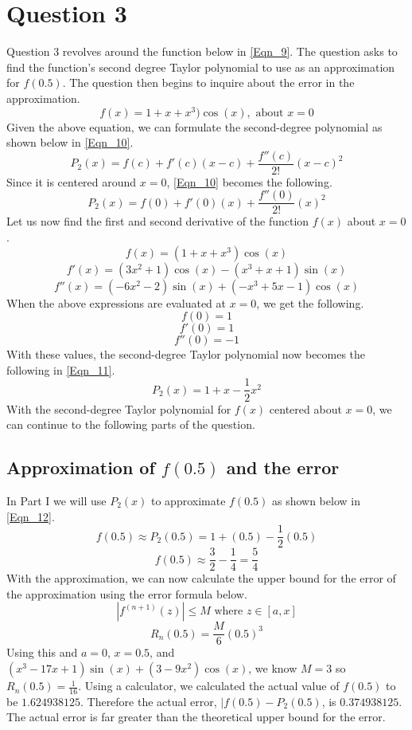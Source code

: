 \documentclass{article}
\begin{document}
\section{Question 3}
Question 3 revolves around the function below in \ref{Eqn_9}. The question asks to find the function's second degree Taylor polynomial to use as an approximation for \(f(0.5)\). The question then begins to inquire about the error in the approximation.
\begin{equation}
    \label{Eqn_9}
    f(x) = 1 + x + x^3)\cos{(x)}, \mbox{ about } x = 0
\end{equation}
Given the above equation, we can formulate the second-degree polynomial as shown below in \ref{Eqn_10}.
\begin{equation}
    \label{Eqn_10}
    P_2(x) = f(c) + f'(c)(x-c) + \frac{f''(c)}{2!}(x-c)^2
\end{equation}
Since it is centered around \(x=0\), \ref{Eqn_10} becomes the following.
\[
P_2(x) = f(0) + f'(0)(x) + \frac{f''(0)}{2!}(x)^2
\]
Let us now find the first and second derivative of the function \(f(x)\) about \(x=0\).
\[
f(x) = (1 + x + x^3)\cos{(x)}
\]
\[
f'(x) = \left(3x^{2} + 1\right) \cos\left(x\right) - \left(x^{3} + x + 1\right) \sin\left(x\right)
\]
\[
f''(x) = \left(-6x^{2} - 2\right) \sin\left(x\right) + \left(-x^{3} + 5x - 1\right) \cos\left(x\right)
\]
When the above expressions are evaluated at \(x=0\), we get the following.
\[
f(0) = 1
\]
\[
f'(0) = 1
\]
\[
f''(0) = -1
\]
With these values, the second-degree Taylor polynomial now becomes the following in \ref{Eqn_11}.
\begin{equation}
    \label{Eqn_11}
    P_2(x) = 1 + x - \frac{1}{2}x^2
\end{equation}
With the second-degree Taylor polynomial for \(f(x)\) centered about \(x=0\), we can continue to the following parts of the question.

\subsection{Approximation of \(f(0.5)\) and the error}
In Part I we will use \(P_2(x)\) to approximate \(f(0.5)\) as shown below in \ref{Eqn_12}.
\begin{equation}
    \label{Eqn_12}
    f(0.5) \approx P_2(0.5) = 1 + (0.5) - \frac{1}{2}(0.5)
\end{equation}
\[
f(0.5) \approx \frac{3}{2} - \frac{1}{4} = \frac{5}{4}
\]
With the approximation, we can now calculate the upper bound for the error of the approximation using the error formula below.
\[
|f^{(n+1)}(z)| \leq M \mbox{ where } z \in [a,x]
\]
\[
R_n(0.5) = \frac{M}{6}(0.5)^3
\]
Using this and \(a = 0\), \(x = 0.5\), and \(\left(x^{3} - 17x + 1\right) \sin\left(x\right) + \left(3 - 9x^{2}\right) \cos\left(x\right)\), we know \(M =  3\) so \(R_n(0.5) = \frac{1}{16}\). Using a calculator, we calculated the actual value of \(f(0.5)\) to be \(1.624938125\). Therefore the actual error, \(|f(0.5) - P_2(0.5)\), is \(0.374938125\). The actual error is far greater than the theoretical upper bound for the error.
\end{document}
